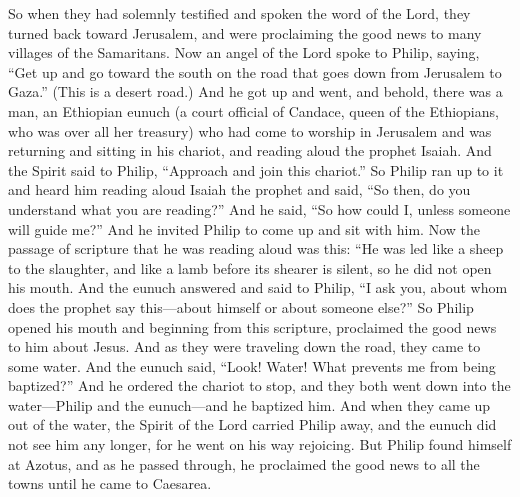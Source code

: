 \begin{biblechapter}
\verse So when they had solemnly testified and spoken the word of the Lord, they turned back toward Jerusalem, and were proclaiming the good news to many villages of the Samaritans.
 Now an angel of the Lord spoke to Philip, saying, “Get up and go toward the south on the road that goes down from Jerusalem to Gaza.” (This is a desert road.)
\verse And he got up and went, and behold, there was a man, an Ethiopian eunuch (a court official of Candace, queen of the Ethiopians, who was over all her treasury) who had come to worship in Jerusalem
\verse and was returning and sitting in his chariot, and reading aloud the prophet Isaiah.
\verse And the Spirit said to Philip, “Approach and join this chariot.”
\verse So Philip ran up to it and heard him reading aloud Isaiah the prophet and said, “So then, do you understand what you are reading?”
\verse And he said, “So how could I, unless someone will guide me?” And he invited Philip to come up and sit with him.
\verse Now the passage of scripture that he was reading aloud was this:
\verse “He was led like a sheep to the slaughter, 
and like a lamb before its shearer is silent, 
so he did not open his mouth.
\verse And the eunuch answered and said to Philip, “I ask you, about whom does the prophet say this—about himself or about someone else?”
\verse So Philip opened his mouth and beginning from this scripture, proclaimed the good news to him about Jesus.
\verse And as they were traveling down the road, they came to some water. And the eunuch said, “Look! Water! What prevents me from being baptized?”
\verse And he ordered the chariot to stop, and they both went down into the water—Philip and the eunuch—and he baptized him.
\verse And when they came up out of the water, the Spirit of the Lord carried Philip away, and the eunuch did not see him any longer, for he went on his way rejoicing.
\verse But Philip found himself at Azotus, and as he passed through, he proclaimed the good news to all the towns until he came to Caesarea.
\end{biblechapter}

